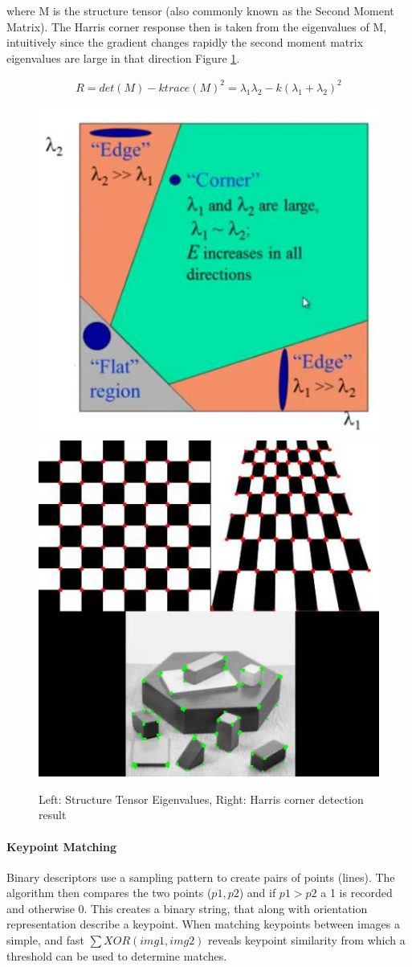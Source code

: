 \documentclass[a4paper,11pt,notitlepage]{article}
\begin{document}
where M is the structure tensor (also commonly known as the Second Moment Matrix). The Harris corner response then is taken from the eigenvalues of M, intuitively since the gradient changes rapidly the second moment matrix eigenvalues are large in that direction Figure \ref{Harris}.


\begin{equation}
\begin{aligned}
R = det(M) - \mathit{k}trace(M)^{2} = \lambda_{1}\lambda_{2} - \mathit{k}(\lambda_{1} + \lambda_{2})^{2}
\end{aligned}
\end{equation}

\noindent \begin{figure}[h!] 
	\includegraphics[width = 0.5\hsize]{figures/harris_region.jpg}
	\includegraphics[width = 0.45\hsize]{figures/harris_result.jpg}
	\caption{Left: Structure Tensor Eigenvalues, Right: Harris corner detection result \cite{opencv_harris_article} }
	\label{Harris}
\end{figure}

\paragraph{Keypoint Matching}
Binary descriptors use a sampling pattern to create pairs of points (lines). The algorithm then compares the two points ($p1,p2$) and if $p1 > p2$ a 1 is recorded and otherwise 0. This creates a binary string, that along with orientation representation describe a keypoint. When matching keypoints between images a simple, and fast $\sum XOR(img1,img2)$ reveals keypoint similarity from which a threshold can be used to determine matches.
\end{document}
